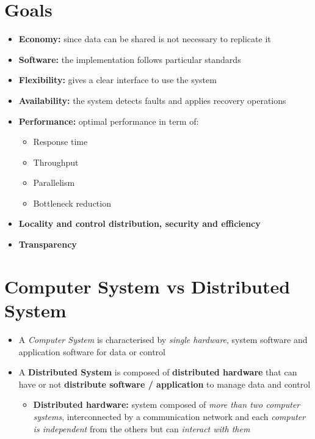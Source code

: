 \section{Goals}
\begin{itemize}
    \item \textbf{Economy:} since data can be shared is not necessary to replicate it
    \item \textbf{Software:} the implementation follows particular standards
    \item \textbf{Flexibility:} gives a clear interface to use the system
    \item \textbf{Availability:} the system detects faults and applies recovery operations
    \item \textbf{Performance:} optimal performance in term of:
        \begin{itemize}
            \item Response time
            \item Throughput
            \item Parallelism
            \item Bottleneck reduction
        \end{itemize}
    \item \textbf{Locality and control distribution, security and efficiency} 
    \item \textbf{Transparency}
\end{itemize}

\section{Computer System vs Distributed System}
\begin{itemize}
    \item A \textit{Computer System} is characterised by \textit{single hardware}, system software and application software for data or control
    \item A \textbf{Distributed System} is composed of \textbf{distributed hardware} that can have or not \textbf{distribute software / application} to manage data and control
        \begin{itemize}
            \item \textbf{Distributed hardware:} system composed of \textit{more than two computer systems}, interconnected by a communication network and each \textit{computer is independent} from the others but can \textit{interact with them}
        \end{itemize}
\end{itemize}

